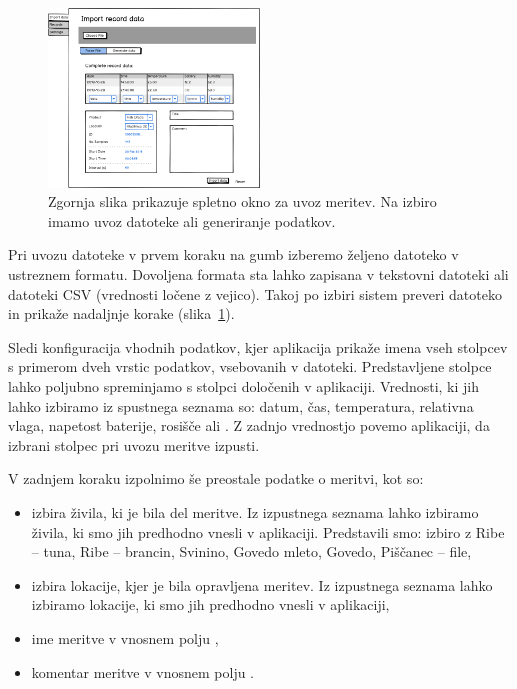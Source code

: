 \documentclass[a4paper, 12pt]{book}
\begin{document}
\begin{figure}[h]
\begin{center}
\includegraphics[width=0.5\textwidth]{slike/Import-data.png}
\end{center}
\caption{Zgornja slika prikazuje spletno okno za uvoz meritev. Na izbiro imamo uvoz datoteke ali generiranje podatkov.}
\label{import-data-wireframe}
\end{figure}

Pri uvozu datoteke v prvem koraku na gumb  izberemo željeno datoteko v ustreznem formatu. Dovoljena formata sta lahko zapisana v tekstovni datoteki ali datoteki CSV (vrednosti ločene z vejico). Takoj po izbiri sistem preveri datoteko in prikaže nadaljnje korake (slika~\ref{import-data-wireframe}).

Sledi konfiguracija vhodnih podatkov, kjer aplikacija prikaže imena vseh stolpcev s primerom dveh vrstic podatkov, vsebovanih v datoteki. Predstavljene stolpce lahko poljubno spreminjamo s stolpci določenih v aplikaciji. Vrednosti, ki jih lahko izbiramo iz spustnega seznama so: datum, čas, temperatura, relativna vlaga, napetost baterije, rosišče ali . Z zadnjo vrednostjo povemo aplikaciji, da izbrani stolpec pri uvozu meritve izpusti.

V zadnjem koraku izpolnimo še preostale podatke o meritvi, kot so: 
\begin{itemize}
	\item izbira živila, ki je bila del meritve. Iz izpustnega seznama  lahko izbiramo živila, ki smo jih predhodno vnesli v aplikaciji. Predstavili smo: izbiro z Ribe – tuna, Ribe – brancin, Svinino, Govedo mleto, Govedo, Piščanec – file,
	
	\item izbira lokacije, kjer je bila opravljena meritev. Iz izpustnega seznama  lahko izbiramo lokacije, ki smo jih predhodno vnesli v aplikaciji,
	
	\item ime meritve v vnosnem polju ,
	
	\item komentar meritve v vnosnem polju .
\end{itemize}
\end{document}
